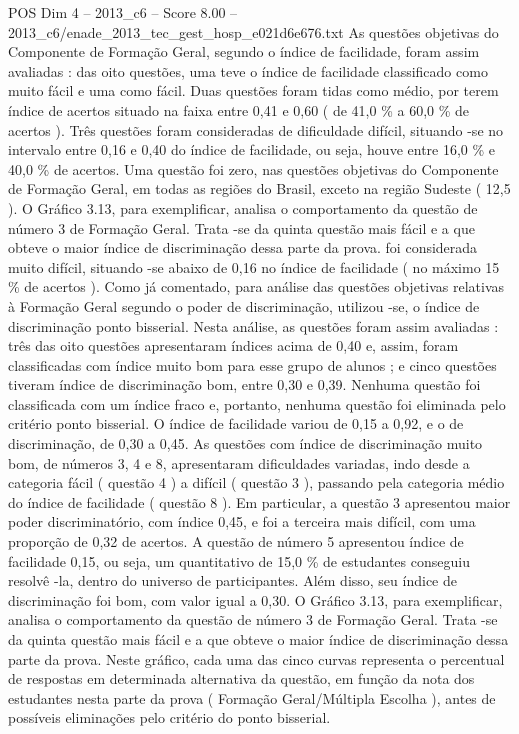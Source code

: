 \begin{textsample}{POS Dim 4 – 2013\_c6 – Score 8.00 – 2013\_c6/enade\_2013\_tec\_gest\_hosp\_e021d6e676.txt}
As questões objetivas do Componente de Formação Geral, segundo o índice de facilidade, foram assim avaliadas : das oito questões, uma teve o índice de facilidade classificado como muito fácil e uma como fácil.
Duas questões foram tidas como médio, por terem índice de acertos situado na faixa entre 0,41 e 0,60 ( de 41,0 \% a 60,0 \% de acertos ).
Três questões foram consideradas de dificuldade difícil, situando -se no intervalo entre 0,16 e 0,40 do índice de facilidade, ou seja, houve entre 16,0 \% e 40,0 \% de acertos.
Uma questão foi zero, nas questões objetivas do Componente de Formação Geral, em todas as regiões do Brasil, exceto na região Sudeste ( 12,5 ).
O Gráfico 3.13, para exemplificar, analisa o comportamento da questão de número 3 de Formação Geral.
Trata -se da quinta questão mais fácil e a que obteve o maior índice de discriminação dessa parte da prova. foi considerada muito difícil, situando -se abaixo de 0,16 no índice de facilidade ( no máximo 15 \% de acertos ).
Como já comentado, para análise das questões objetivas relativas à Formação Geral segundo o poder de discriminação, utilizou -se, o índice de discriminação ponto bisserial.
Nesta análise, as questões foram assim avaliadas : três das oito questões apresentaram índices acima de 0,40 e, assim, foram classificadas com índice muito bom para esse grupo de alunos ; e cinco questões tiveram índice de discriminação bom, entre 0,30 e 0,39.
Nenhuma questão foi classificada com um índice fraco e, portanto, nenhuma questão foi eliminada pelo critério ponto bisserial.
O índice de facilidade variou de 0,15 a 0,92, e o de discriminação, de 0,30 a 0,45.
As questões com índice de discriminação muito bom, de números 3, 4 e 8, apresentaram dificuldades variadas, indo desde a categoria fácil ( questão 4 ) a difícil ( questão 3 ), passando pela categoria médio do índice de facilidade ( questão 8 ).
Em particular, a questão 3 apresentou maior poder discriminatório, com índice 0,45, e foi a terceira mais difícil, com uma proporção de 0,32 de acertos.
A questão de número 5 apresentou índice de facilidade 0,15, ou seja, um quantitativo de 15,0 \% de estudantes conseguiu resolvê -la, dentro do universo de participantes.
Além disso, seu índice de discriminação foi bom, com valor igual a 0,30.
O Gráfico 3.13, para exemplificar, analisa o comportamento da questão de número 3 de Formação Geral.
Trata -se da quinta questão mais fácil e a que obteve o maior índice de discriminação dessa parte da prova.
Neste gráfico, cada uma das cinco curvas representa o percentual de respostas em determinada alternativa da questão, em função da nota dos estudantes nesta parte da prova ( Formação Geral/Múltipla Escolha ), antes de possíveis eliminações pelo critério do ponto bisserial.

\end{textsample}
